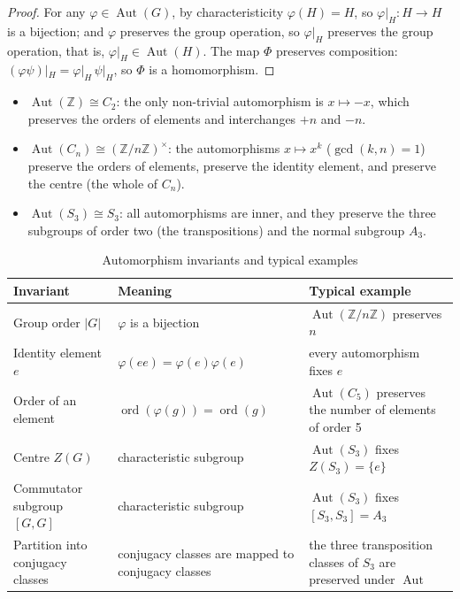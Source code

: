 \begin{proof}
For any $\varphi\in\operatorname{Aut}(G)$, by characteristicity $\varphi(H)=H$, so $\varphi|_H: H\to H$ is a bijection; and $\varphi$ preserves the group operation, so $\varphi|_H$ preserves the group operation, that is, $\varphi|_H\in\operatorname{Aut}(H)$. The map $\Phi$ preserves composition: $(\varphi\psi)|_H=\varphi|_H\,\psi|_H$, so $\Phi$ is a homomorphism.
\end{proof}

\begin{example}\label{ex:automorphism_invariants_examples}
\begin{itemize}
    \item $\operatorname{Aut}(\mathbb{Z}) \cong C_2$: the only non-trivial automorphism is $x\mapsto -x$, which preserves the orders of elements and interchanges $+n$ and $-n$.
    \item $\operatorname{Aut}(C_n) \cong (\mathbb{Z}/n\mathbb{Z})^\times$: the automorphisms $x\mapsto x^k$ ($\gcd(k,n)=1$) preserve the orders of elements, preserve the identity element, and preserve the centre (the whole of $C_n$).
    \item $\operatorname{Aut}(S_3) \cong S_3$: all automorphisms are inner, and they preserve the three subgroups of order two (the transpositions) and the normal subgroup $A_3$.
\end{itemize}
\end{example}

\begin{table}[htbp]
    \centering
    \caption{Automorphism invariants and typical examples}
    \label{tab:automorphism_invariants}
    \small
    \renewcommand{\arraystretch}{1.25}
    \begin{tabular}{@{}>{\raggedright\arraybackslash}p{3.4cm} >{\raggedright\arraybackslash}p{5.0cm} >{\raggedright\arraybackslash}p{4.6cm}@{}}
    \toprule
    Invariant & Meaning & Typical example \\
    \midrule
    Group order $|G|$ & $\varphi$ is a bijection & $\operatorname{Aut}(\mathbb{Z}/n\mathbb{Z})$ preserves $n$ \\
    Identity element $e$ & $\varphi(ee)=\varphi(e)\varphi(e)$ & every automorphism fixes $e$ \\
    Order of an element & $\operatorname{ord}(\varphi(g))=\operatorname{ord}(g)$ & $\operatorname{Aut}(C_5)$ preserves the number of elements of order 5 \\
    Centre $Z(G)$ & characteristic subgroup & $\operatorname{Aut}(S_3)$ fixes $Z(S_3)=\{e\}$ \\
    Commutator subgroup $[G,G]$ & characteristic subgroup & $\operatorname{Aut}(S_3)$ fixes $[S_3,S_3]=A_3$ \\
    Partition into conjugacy classes & conjugacy classes are mapped to conjugacy classes & the three transposition classes of $S_3$ are preserved under $\operatorname{Aut}$ \\
    \bottomrule
    \end{tabular}
\end{table}


